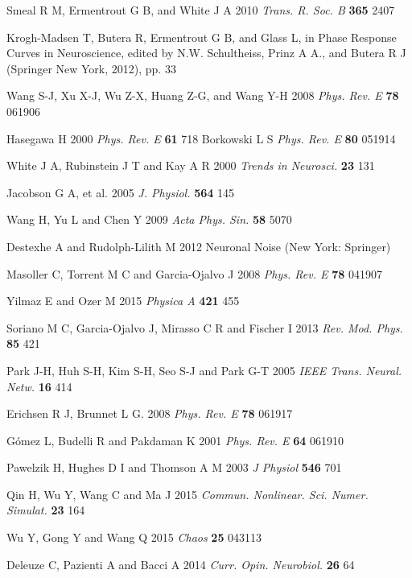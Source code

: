 \documentclass[twocolumn,showpacs,preprintnumbers,amsmath,amssymb,pre,superscriptaddress]{revtex4-1}
\begin{document}
\begin{CJK}{UTF8}{gbsn}
\begin{thebibliography}{999}
Smeal R M, Ermentrout G B, and White J A  2010 \textit{Trans. R. Soc. B} \textbf{365} 2407 

  Krogh-Madsen T, Butera R, Ermentrout G B, and Glass L, in Phase Response Curves in Neuroscience, edited by N.W. Schultheiss,  Prinz A A., and Butera R J (Springer New York, 2012), pp. 33

 Wang S-J, Xu X-J, Wu Z-X, Huang Z-G, and Wang Y-H 2008 \textit{Phys. Rev. E} \textbf{78} 061906

 Hasegawa H 2000 \textit{Phys. Rev. E} \textbf{61} 718
 Borkowski L S \textit{Phys. Rev. E} \textbf{80} 051914

 White J A, Rubinstein J T and Kay A R 2000 \textit{Trends in Neurosci.} \textbf{23} 131

 Jacobson G A, et al. 2005 \textit{J. Physiol.} \textbf{564} 145

 Wang H, Yu L and Chen Y 2009 \textit{Acta Phys. Sin.} \textbf{58} 5070

 Destexhe A and Rudolph-Lilith M 2012 Neuronal Noise (New York: Springer)

 Masoller C, Torrent M C and Garcia-Ojalvo J 2008 \textit{Phys. Rev. E} \textbf{78} 041907

 Yilmaz E and Ozer M 2015 \textit{Physica A} \textbf{421} 455

 Soriano M C, Garcia-Ojalvo J, Mirasso C R and Fischer I 2013 \textit{Rev. Mod. Phys.} \textbf{85} 421

 Park J-H, Huh S-H, Kim S-H, Seo S-J and Park G-T 2005 \textit{IEEE Trans. Neural. Netw.} \textbf{16} 414

 Erichsen R J, Brunnet L G. 2008  \textit{Phys. Rev. E} \textbf{78} 061917

 G\'{o}mez L, Budelli R and Pakdaman K 2001 \textit{Phys. Rev. E} \textbf{64} 061910

 Pawelzik H, Hughes D I and Thomson A M 2003 \textit{J Physiol} \textbf{546} 701

 Qin H, Wu Y, Wang C and Ma J 2015 \textit{Commun. Nonlinear. Sci. Numer. Simulat.} \textbf{23} 164

 Wu Y, Gong Y and Wang Q 2015 \textit{Chaos} \textbf{25} 043113

 Deleuze C, Pazienti A and Bacci A 2014 \textit{Curr. Opin. Neurobiol.} \textbf{26} 64

\end{thebibliography}

\end{CJK}
\end{document}
